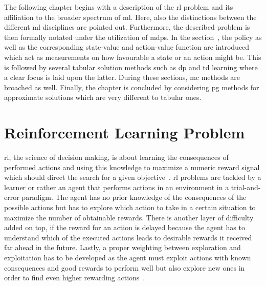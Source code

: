 \documentclass[draft,final]{vutinfth} %
\newcommand{\p}[1]{see p. #1}
\begin{document}
    The following chapter begins with a description of the \gls{rl} problem and its affiliation to the broader spectrum of \gls{ml}.
    Here, also the distinctions between the different \gls{ml} disciplines are pointed out.
    Furthermore, the described problem is then formally notated under the utilization of \glspl{mdp}.
    In the section~, the policy as well as the corresponding state-value and action-value function are introduced which act as measurements on how favourable a state or an action might be.
    This is followed by several tabular solution methods such as \gls{dp} and \gls{td} learning where a clear focus is laid upon the latter.
    During these sections, \gls{mc} methods are broached as well.
    Finally, the chapter is concluded by considering \gls{pg} methods for approximate solutions which are very different to tabular ones.


    \section{Reinforcement Learning Problem}\label{sec:reinforcement-learning-problem}
    \gls{rl}, the science of decision making, is about learning the consequences of performed actions and using this knowledge to maximize a numeric reward signal which should direct the search for a given objective~\citep[\p{1f}]{sutton_reinforcement_2018}.
    \gls{rl} problems are tackled by a learner or rather an agent that performs actions in an environment in a trial-and-error paradigm.
    The agent has no prior knowledge of the consequences of the possible actions but has to explore which action to take in a certain situation to maximize the number of obtainable rewards.
    There is another layer of difficulty added on top, if the reward for an action is delayed because the agent has to understand which of the executed actions leads to desirable rewards it received far ahead in the future.
    Lastly, a proper weighting between exploration and exploitation has to be developed as the agent must exploit actions with known consequences and good rewards to perform well but also explore new ones in order to find even higher rewarding actions~\citep{kaelbling_reinforcement_1996}.
\end{document}
